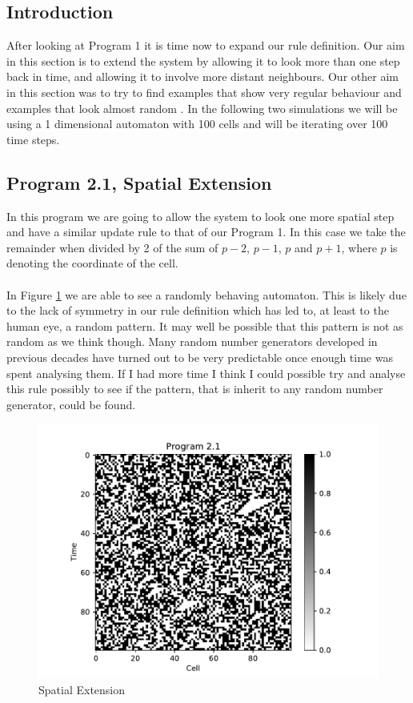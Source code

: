 \documentclass{article}
\begin{document}
\subsection{Introduction}
After looking at Program 1 it is time now to expand our rule definition. Our aim in this section is to extend the system by allowing it to look more than one step back in time, and allowing it to involve more distant neighbours. Our other aim in this section was to try to find examples that show very regular behaviour and examples that look almost random \cite{proj}. In the following two simulations we will be using a 1 dimensional automaton with 100 cells and will be iterating over 100 time steps. 

\subsection{Program 2.1, Spatial Extension}
In this program we are going to allow the system to look one more spatial step and have a similar update rule to that of our Program 1. In this case we take the remainder when divided by 2 of the sum of $p-2$, $p-1$, $p$ and $p+1$, where $p$ is denoting the coordinate of the cell.\\
\\
In Figure \ref{fig:prog21} we are able to see a randomly behaving automaton. This is likely due to the lack of symmetry in our rule definition which has led to, at least to the human eye, a random pattern. It may well be possible that this pattern is not as random as we think though. Many random number generators developed in previous decades have turned out to be very predictable once enough time was spent analysing them. If I had more time I think I could possible try and analyse this rule possibly to see if the pattern, that is inherit to any random number generator, could be found.
\begin{figure}[H]
\centering
\includegraphics[scale=0.6]{program21.pdf}
\caption{Spatial Extension}\label{fig:prog21}
\end{figure}
\end{document}
